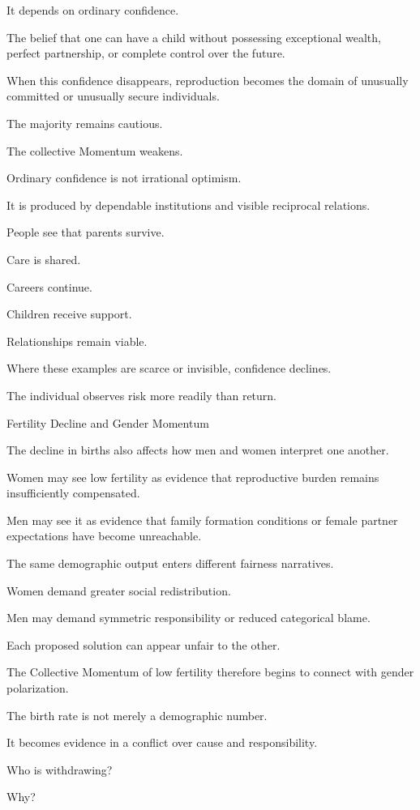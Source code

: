 It depends on ordinary confidence.

The belief that one can have a child without possessing exceptional wealth, perfect partnership, or complete control over the future.

When this confidence disappears, reproduction becomes the domain of unusually committed or unusually secure individuals.

The majority remains cautious.

The collective Momentum weakens.

Ordinary confidence is not irrational optimism.

It is produced by dependable institutions and visible reciprocal relations.

People see that parents survive.

Care is shared.

Careers continue.

Children receive support.

Relationships remain viable.

Where these examples are scarce or invisible, confidence declines.

The individual observes risk more readily than return.

Fertility Decline and Gender Momentum

The decline in births also affects how men and women interpret one another.

Women may see low fertility as evidence that reproductive burden remains insufficiently compensated.

Men may see it as evidence that family formation conditions or female partner expectations have become unreachable.

The same demographic output enters different fairness narratives.

Women demand greater social redistribution.

Men may demand symmetric responsibility or reduced categorical blame.

Each proposed solution can appear unfair to the other.

The Collective Momentum of low fertility therefore begins to connect with gender polarization.

The birth rate is not merely a demographic number.

It becomes evidence in a conflict over cause and responsibility.

Who is withdrawing?

Why?


